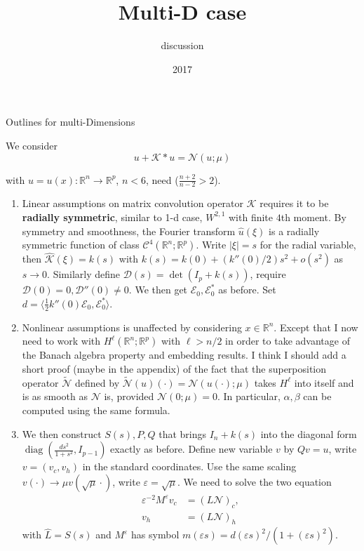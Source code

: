 \documentclass[letterpaper,11pt]{article}
\title{Multi-D case}
\author{discussion}
\date{2017}
\newcommand{\R}{\mathbb{R}}
\newcommand{\eps}{\varepsilon}
\newcommand{\Nl}{\mathcal{N}}
\newcommand{\K}{\mathcal{K}}
\newcommand{\cD}{\mathcal{D}}
\newcommand{\diag}{\operatorname{diag}}
\numberwithin{equation}{section}
\theoremstyle{plain}
\theoremstyle{remark}
\begin{document}
\maketitle

Outlines for multi-Dimensions

We consider
\begin{equation}
u+\K \ast u = \Nl(u;\mu)
\end{equation}

with $u=u(x):\R^n \to \R^p$, $n<6$, need ($\frac{n+2}{n-2}>2$). 



\begin{enumerate}

\item Linear assumptions on matrix convolution operator $\K$ requires it to be \textbf{radially symmetric}, similar to 1-d case, $W^{2,1}$ with finite $4$th moment. By symmetry and smoothness, the Fourier transform $\widehat{u}(\xi)$ is a radially symmetric function of class $\mathscr{C}^4(\R^n;\R^p)$. Write $|\xi|=s$ for the radial variable, then $\widehat{\K}(\xi) = k(s)$ with $k(s) = k(0)+(k''(0)/2) s^2 + o(s^2)$ as $s\to 0$. Similarly define $\mathcal{D}(s) = \det(I_p+k(s))$, require $\cD(0)=0, \cD''(0) \neq 0$. We then get $\mathcal{E}_0,\mathcal{E}_0^*$ as before. Set $d=\langle \frac{1}{2}k''(0)\mathcal{E}_0,\mathcal{E}_0^*\rangle$.

\item Nonlinear assumptions is unaffected by considering $x\in \R^n$. Except that I now need to work with $H^\ell(\R^n;\R^p)$ with $\ell > n/2$ in order to take advantage of the Banach algebra property and embedding results. I think I should add a short proof (maybe in the appendix) of the fact that the superposition operator $\tilde{\Nl}$ defined by $\tilde{\Nl}(u)(\cdot) = \Nl(u(\cdot);\mu)$ takes $H^\ell$ into itself and is as smooth as $\Nl$ is, provided $\Nl(0;\mu)=0$. In particular, $\alpha,\beta$ can be computed using the same formula.


\item We then construct $S(s),P,Q$ that brings $I_n+k(s)$ into the diagonal form $\displaystyle \diag\left(\frac{ds^2}{1+s^2},I_{p-1}\right)$ exactly as before. Define new variable $v$ by $Qv = u$, write $v=(v_c,v_h)$ in the standard coordinates. Use the same scaling $v(\cdot) \to \mu v(\sqrt{\mu} \cdot) $, write $\eps = \sqrt{\mu}$. We need to solve the two equation
\begin{eqnarray}
\eps^{-2}M^{\eps}v_c &= (L\Nl)_c,\\
v_h  &= (L\Nl)_h
\end{eqnarray}
with $\widehat{L} = S(s)$ and $M^\eps$ has symbol $m(\eps s)=d(\eps s)^2/(1+(\eps s)^2)$.


\end{enumerate}
\end{document}
